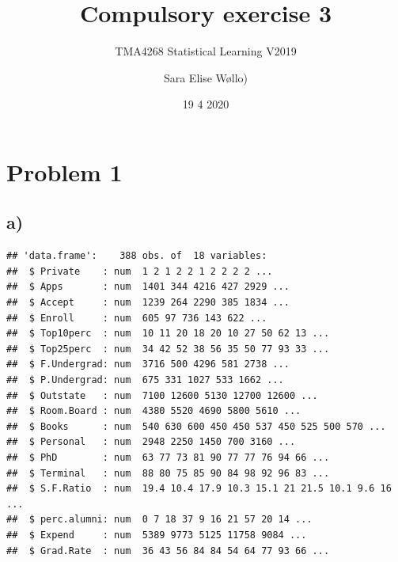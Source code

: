 \documentclass[
]{article}
\title{Compulsory exercise 3}
\subtitle{TMA4268 Statistical Learning V2019}
\author{Sara Elise Wøllo)}
\date{19 4 2020}
\newenvironment{Shaded}{\begin{snugshade}}{\end{snugshade}}
\newcommand{\DecValTok}[1]{\textcolor[rgb]{0.00,0.00,0.81}{#1}}
\newcommand{\FloatTok}[1]{\textcolor[rgb]{0.00,0.00,0.81}{#1}}
\newcommand{\KeywordTok}[1]{\textcolor[rgb]{0.13,0.29,0.53}{\textbf{#1}}}
\newcommand{\NormalTok}[1]{#1}
\newcommand{\OperatorTok}[1]{\textcolor[rgb]{0.81,0.36,0.00}{\textbf{#1}}}
\newcommand{\StringTok}[1]{\textcolor[rgb]{0.31,0.60,0.02}{#1}}
\begin{document}
\maketitle

\hypertarget{problem-1}{%
\section{Problem 1}\label{problem-1}}

\hypertarget{a}{%
\subsection{a)}\label{a}}

\begin{Shaded}
\end{Shaded}

\begin{verbatim}
## 'data.frame':    388 obs. of  18 variables:
##  $ Private    : num  1 2 1 2 2 1 2 2 2 2 ...
##  $ Apps       : num  1401 344 4216 427 2929 ...
##  $ Accept     : num  1239 264 2290 385 1834 ...
##  $ Enroll     : num  605 97 736 143 622 ...
##  $ Top10perc  : num  10 11 20 18 20 10 27 50 62 13 ...
##  $ Top25perc  : num  34 42 52 38 56 35 50 77 93 33 ...
##  $ F.Undergrad: num  3716 500 4296 581 2738 ...
##  $ P.Undergrad: num  675 331 1027 533 1662 ...
##  $ Outstate   : num  7100 12600 5130 12700 12600 ...
##  $ Room.Board : num  4380 5520 4690 5800 5610 ...
##  $ Books      : num  540 630 600 450 450 537 450 525 500 570 ...
##  $ Personal   : num  2948 2250 1450 700 3160 ...
##  $ PhD        : num  63 77 73 81 90 77 77 76 94 66 ...
##  $ Terminal   : num  88 80 75 85 90 84 98 92 96 83 ...
##  $ S.F.Ratio  : num  19.4 10.4 17.9 10.3 15.1 21 21.5 10.1 9.6 16 ...
##  $ perc.alumni: num  0 7 18 37 9 16 21 57 20 14 ...
##  $ Expend     : num  5389 9773 5125 11758 9084 ...
##  $ Grad.Rate  : num  36 43 56 84 84 54 64 77 93 66 ...
\end{verbatim}
\end{document}
